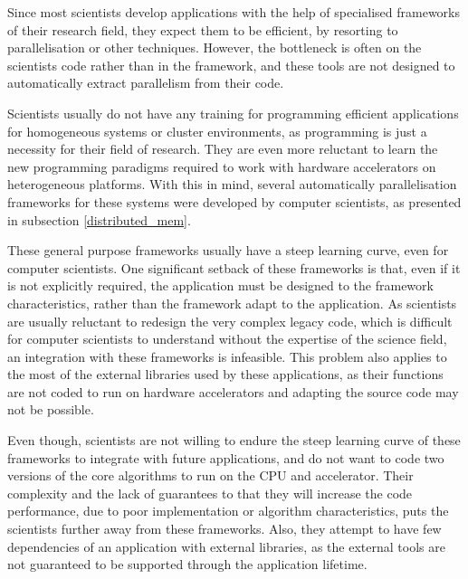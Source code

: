 Since most scientists develop applications with the help of specialised frameworks of their research field, they expect them to be efficient, by resorting to parallelisation or other techniques. However, the bottleneck is often on the scientists code rather than in the framework, and these tools are not designed to automatically extract parallelism from their code.

Scientists usually do not have any training for programming efficient applications for homogeneous systems or cluster environments, as programming is just a necessity for their field of research. They are even more reluctant to learn the new programming paradigms required to work with hardware accelerators on heterogeneous platforms. With this in mind, several automatically parallelisation frameworks for these systems were developed by computer scientists, as presented in subsection \ref{distributed_mem}.

These general purpose frameworks usually have a steep learning curve, even for computer scientists. One significant setback of these frameworks is that, even if it is not explicitly required, the application must be designed to the framework characteristics, rather than the framework adapt to the application. As scientists are usually reluctant to redesign the very complex legacy code, which is difficult for computer scientists to understand without the expertise of the science field, an integration with these frameworks is infeasible. This problem also applies to the most of the external libraries used by these applications, as their functions are not coded to run on hardware accelerators and adapting the source code may not be possible.

Even though, scientists are not willing to endure the steep learning curve of these frameworks to integrate with future applications, and do not want to code two versions of the core algorithms to run on the CPU and accelerator. Their complexity and the lack of guarantees to that they will increase the code performance, due to poor implementation or algorithm characteristics, puts the scientists further away from these frameworks. Also, they attempt to have few dependencies of an application with external libraries, as the external tools are not guaranteed to be supported through the application lifetime.

